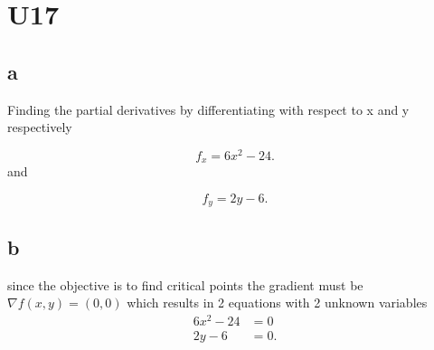 


\section{U17} 

\subsection{a} 

Finding the partial derivatives by differentiating with respect to x and y respectively

\[
f_{x} = 6x^2-24
.\] 
and

\[
f_{y} = 2y-6
.\] 


\subsection{b}

since the objective is to find critical points the gradient must be $\nabla f(x,y) = (0, 0)$ which results in 2 equations with 2 unknown variables
\begin{align*}
	6x^2-24&=0\\ 2y-6&=0
.\end{align*}













